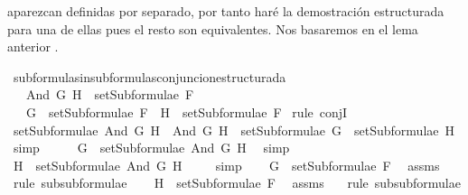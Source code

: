 \begin{isabellebody}
\begin{isamarkuptext}
aparezcan definidas por separado, por tanto haré la demostración estructurada para
una de ellas pues el resto son equivalentes. 
Nos basaremos en el lema anterior .%
\end{isamarkuptext}\isamarkuptrue%
\isamarkupfalse%
\ subformulas{\isacharunderscore}in{\isacharunderscore}subformulas{\isacharunderscore}conjuncion{\isacharunderscore}estructurada{\isacharcolon}\isanewline
\ \ \ {\isachardoublequoteopen}And\ G\ H\ {\isasymin}\ setSubformulae\ F{\isachardoublequoteclose}\ \isanewline
\ \ \ {\isachardoublequoteopen}G\ {\isasymin}\ setSubformulae\ F\ {\isasymand}\ H\ {\isasymin}\ setSubformulae\ F{\isachardoublequoteclose}\isanewline
%
\isadelimproof
%
\endisadelimproof
%
\isatagproof
{}\isamarkupfalse%
\ {\isacharparenleft}rule\ conjI{\isacharparenright}\isanewline
\ \ \isamarkupfalse%
\ {}{\isacharcolon}{\isachardoublequoteopen}setSubformulae\ {\isacharparenleft}And\ G\ H{\isacharparenright}\ {\isacharequal}\ {\isacharbraceleft}And\ G\ H{\isacharbraceright}\ {\isasymunion}\ setSubformulae\ G\ {\isasymunion}\ setSubformulae\ H{\isachardoublequoteclose}\ \isamarkupfalse%
\ simp\isanewline
\ \ \isamarkupfalse%
\ \isamarkupfalse%
\ {}{\isacharcolon}{\isachardoublequoteopen}G\ {\isasymin}\ setSubformulae\ {\isacharparenleft}And\ G\ H{\isacharparenright}{\isachardoublequoteclose}\ \isamarkupfalse%
\ simp\isanewline
\ \ \isamarkupfalse%
\ {}{\isacharcolon}{\isachardoublequoteopen}H\ {\isasymin}\ setSubformulae\ {\isacharparenleft}And\ G\ H{\isacharparenright}{\isachardoublequoteclose}\ \isamarkupfalse%
\ {}\ \isamarkupfalse%
\ simp\isanewline
\ \ \isamarkupfalse%
\ {\isachardoublequoteopen}G\ {\isasymin}\ setSubformulae\ F{\isachardoublequoteclose}\ \isamarkupfalse%
\ assms\ {}\ \isamarkupfalse%
\ {\isacharparenleft}rule\ subsubformulae{\isacharparenright}\isanewline
\ \ \isamarkupfalse%
\ {\isachardoublequoteopen}H\ {\isasymin}\ setSubformulae\ F{\isachardoublequoteclose}\ \isamarkupfalse%
\ assms\ {}\ \isamarkupfalse%
\ {\isacharparenleft}rule\ subsubformulae{\isacharparenright}\isanewline
{}\isamarkupfalse%
%
\endisatagproof
{\isafoldproof}%
%
\isadelimproof
\isanewline
%
\endisadelimproof
\isanewline
{}\isamarkupfalse%

\end{isabellebody}
